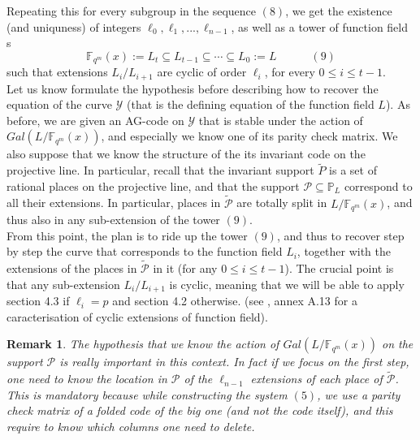 \documentclass[10pt]{article}
\newtheorem{rq1}{Remark}[]
\newcommand{\s}{\vspace{0.3cm}}
\newcommand{\fqm}{\mathbb{F}_{q^m}}
\newcommand{\su}{\subseteq}
\newcommand{\Y}{\mathcal{Y}}
\newcommand{\PR}{\mathcal{P}}
\begin{document}
\s

Repeating this for every subgroup in the sequence $(8)$, we get the existence (and uniquness) of integers $\ell_0,\ell_1,...,\ell_{n-1}$, as well as a tower of function field s
\[\fqm(x) := L_t \su L_{t-1} \su \cdots \su L_0 := L \quad \quad \quad (9)\]
such that extensions $L_i/L_{i+1}$ are cyclic of order $\ell_i$, for every $0 \leq i \leq t-1$. \\

Let us know formulate the hypothesis before describing how to recover the equation of the curve $\Y$ (that is the defining equation of the function field $L$). As before, we are given an AG-code on $\Y$ that is stable under the action of $Gal(L/\fqm(x))$, and especially we know one of its parity check matrix. We also suppose that we know the structure of the its invariant code on the projective line. In particular, recall that the invariant support $\tilde{P}$ is a set of rational places on the projective line, and that the support $\PR \su \mathbb{P}_L$ correspond to all their extensions. In particular, places in $\tilde{\PR}$ are  totally split in $L/\fqm(x)$, and thus also in any sub-extension of the tower $(9)$. \\

From this point, the plan is to ride up the tower $(9)$, and thus to recover step by step the curve that corresponds to the function field $L_i$, together with the extensions of the places in $\tilde{\PR}$ in it (for any $0\leq i \leq t-1$). The crucial point is that any sub-extension $L_i/L_{i+1}$ is cyclic, meaning that we will be able to apply section 4.3 if $\ell_i = p$ and section 4.2 otherwise. (see \cite{Sti}, annex A.13 for a caracterisation of cyclic extensions of function field).

\s

\begin{rq1} \rm
The hypothesis that we know the action of $Gal(L/\fqm(x))$ on the support $\PR$ is really important in this context. In fact if we focus on the first step, one need to know the location in $\PR$ of the $\ell_{n-1}$ extensions of each place of $\tilde{\PR}$. This is mandatory because while constructing the system $(5)$, we  use a parity check matrix of a folded code of the big one (and not the code itself), and this require to know which columns one need to delete. 
\end{rq1}

\s
\end{document}
